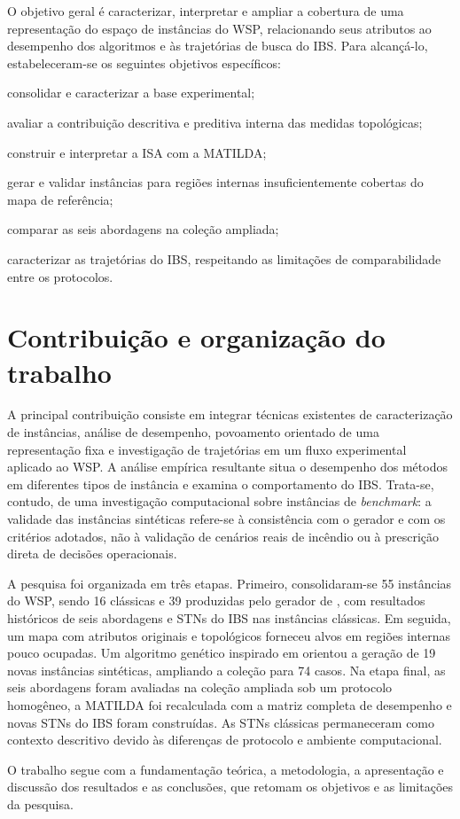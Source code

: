 O objetivo geral é caracterizar, interpretar e ampliar a cobertura de uma
representação do espaço de instâncias do WSP, relacionando seus atributos
ao desempenho dos algoritmos e às trajetórias de busca do IBS.
Para alcançá-lo, estabeleceram-se os seguintes objetivos específicos:
\begin{alineas}
 \item consolidar e caracterizar a base experimental;
 \item avaliar a contribuição descritiva e preditiva interna das medidas topológicas;
 \item construir e interpretar a ISA com a MATILDA;
 \item gerar e validar instâncias para regiões internas insuficientemente cobertas do mapa de referência;
 \item comparar as seis abordagens na coleção ampliada;
 \item caracterizar as trajetórias do IBS, respeitando as limitações de comparabilidade entre os protocolos.
\end{alineas}

\section{Contribuição e organização do trabalho}\label{sec:contribuicao}

A principal contribuição consiste em integrar técnicas existentes de
caracterização de instâncias, análise de desempenho, povoamento orientado de
uma representação fixa e investigação de trajetórias em um fluxo experimental
aplicado ao WSP. A análise empírica resultante situa o desempenho dos métodos em
diferentes tipos de instância e examina o comportamento do IBS. Trata-se,
contudo, de uma investigação computacional sobre instâncias de \textit{benchmark}:
a validade das instâncias sintéticas
refere-se à consistência com o gerador e com os critérios adotados, não à
validação de cenários reais de incêndio ou à prescrição direta de decisões
operacionais.

A pesquisa foi organizada em três etapas. Primeiro, consolidaram-se 55 instâncias
do WSP, sendo 16 clássicas e 39 produzidas pelo gerador de
, com resultados históricos de seis abordagens e STNs
do IBS nas instâncias clássicas. Em seguida, um mapa com atributos originais e topológicos forneceu alvos
em regiões internas pouco ocupadas. Um algoritmo genético inspirado em
 orientou a geração de 19 novas instâncias
sintéticas, ampliando a coleção para 74 casos. Na etapa final,
as seis abordagens foram avaliadas na coleção ampliada sob um protocolo homogêneo,
a MATILDA foi recalculada com a matriz completa de desempenho e novas STNs do IBS
foram construídas. As STNs clássicas permaneceram como contexto descritivo devido
às diferenças de protocolo e ambiente computacional.

O trabalho segue com a fundamentação teórica, a metodologia, a apresentação
e discussão dos resultados e as conclusões, que retomam os objetivos e as
limitações da pesquisa.

